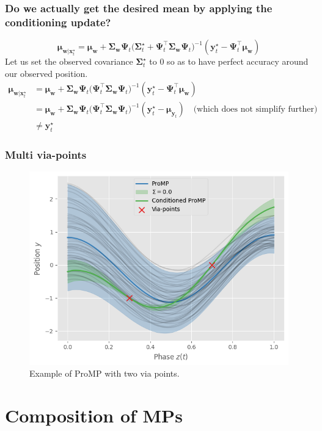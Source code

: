 \documentclass{article}
\begin{document}
\subsubsection{Do we actually get the desired mean by applying the conditioning update?}
\begin{equation}
  \bm{\mu}_{\bm{w}|\bm{x}_t^\star} = \bm{\mu_w} + \bm{\Sigma_w}\bm{\Psi}_t \Big(\bm{\Sigma}_t^\star + \bm{\Psi}_t^\top \bm{\Sigma_w}\bm{\Psi}_t \Big)^{-1} (\bm{y}_t^\star - \bm{\Psi}_t^\top \bm{\mu_w})
  \end{equation}
  Let us set the observed covariance $\bm{\Sigma}_t^\star$ to $0$ so as to have perfect accuracy around our observed position.
\begin{align}
  \bm{\mu}_{\bm{w}|\bm{x}_t^\star} &= \bm{\mu_w} + \bm{\Sigma_w}\bm{\Psi}_t \Big( \bm{\Psi}_t^\top \bm{\Sigma_w}\bm{\Psi}_t \Big)^{-1} (\bm{y}_t^\star - \bm{\Psi}_t^\top \bm{\mu_w})\\
                                   &= \bm{\mu_w} + \bm{\Sigma_w}\bm{\Psi}_t \Big( \bm{\Psi}_t^\top \bm{\Sigma_w}\bm{\Psi}_t \Big)^{-1} (\bm{y}_t^\star - \bm{\mu}_{\bm{y}_{t}}) \quad \text{(which does not simplify further)}\\
                                   &\neq \bm{y}_t^\star
  \end{align}

  \subsubsection{Multi via-points}

\begin{figure}[htbp]
  \centering
  \includegraphics[width=0.5\linewidth]{fig/2-via-points.png}
  \caption{Example of ProMP with two via points.}
  \label{fig:multi-via-pts}
\end{figure}



\section{Composition of MPs}
\end{document}
